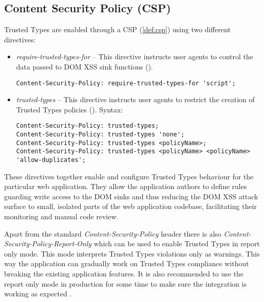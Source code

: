 \subsection{Content Security Policy (CSP)}
\label{csp}

Trusted Types are enabled through a CSP (\ref{def:csp}) using two different directives:

\begin{itemize}
  \item \textit{require-trusted-types-for} -- This directive instructs user agents to control the
        data passed to DOM XSS sink functions (\cite{mdn:require-trusted-types-for}).

        \bigskip
        \begin{lstlisting}[language={}, caption=Syntax of require-trusted-types-for directive]
Content-Security-Policy: require-trusted-types-for 'script';\end{lstlisting}

  \item \textit{trusted-types} -- This directive instructs user agents to restrict the creation of
        Trusted Types policies (\cite{mdn:trusted-types}). Syntax:

        \bigskip
        \begin{lstlisting}[language={}, caption=Syntax of trusted-types directive]
Content-Security-Policy: trusted-types;
Content-Security-Policy: trusted-types 'none';
Content-Security-Policy: trusted-types <policyName>;
Content-Security-Policy: trusted-types <policyName> <policyName> 'allow-duplicates';\end{lstlisting}

\end{itemize}

These directives together enable and configure Trusted Types behaviour for the particular web
application. They allow the application authors to define rules guarding write access to the DOM
sinks and thus reducing the DOM XSS attack surface to small, isolated parts of the web application
codebase, facilitating their monitoring and manual code review.

Apart from the standard \textit{Content-Security-Policy} header there is also
\textit{Content-Security-Policy-Report-Only} which can be used to enable Trusted Types in report
only mode. This mode interprets Trusted Types violations only as warnings. This way the application
can gradually work on Trusted Types compliance without breaking the existing application features.
It is also recommended to use the report only mode in production for some time to make sure the
integration is working as expected \cite{tt_web_framework_paper}.


